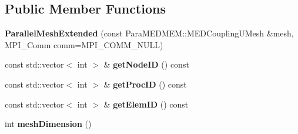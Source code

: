 \subsection*{Public Member Functions}
\begin{DoxyCompactItemize}
\item 
\hypertarget{class_parallel_mesh_extended_a0be992f122b572d6f5bf1f2079152c88}{{\bfseries Parallel\-Mesh\-Extended} (const Para\-M\-E\-D\-M\-E\-M\-::\-M\-E\-D\-Coupling\-U\-Mesh \&mesh, M\-P\-I\-\_\-\-Comm comm=M\-P\-I\-\_\-\-C\-O\-M\-M\-\_\-\-N\-U\-L\-L)}\label{class_parallel_mesh_extended_a0be992f122b572d6f5bf1f2079152c88}

\item 
\hypertarget{class_parallel_mesh_extended_a4ffaee6ac14a4010be015c8962a2b9b5}{const std\-::vector$<$ int $>$ \& {\bfseries get\-Node\-I\-D} () const }\label{class_parallel_mesh_extended_a4ffaee6ac14a4010be015c8962a2b9b5}

\item 
\hypertarget{class_parallel_mesh_extended_a51dcfe18578035f50f470e012217dd79}{const std\-::vector$<$ int $>$ \& {\bfseries get\-Proc\-I\-D} () const }\label{class_parallel_mesh_extended_a51dcfe18578035f50f470e012217dd79}

\item 
\hypertarget{class_parallel_mesh_extended_adcdc784bda5416960f835b5541846e0a}{const std\-::vector$<$ int $>$ \& {\bfseries get\-Elem\-I\-D} () const }\label{class_parallel_mesh_extended_adcdc784bda5416960f835b5541846e0a}

\item 
\hypertarget{class_parallel_mesh_extended_abde3b507dc64b44a463f33b851c0bc5d}{int {\bfseries mesh\-Dimension} ()}\label{class_parallel_mesh_extended_abde3b507dc64b44a463f33b851c0bc5d}

\end{DoxyCompactItemize}
